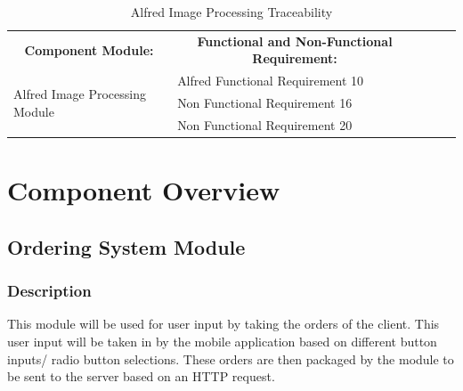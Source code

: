 \documentclass [10pt]{article}
\begin{document}
\begin{table}[h!]
\centering
\begin{tabular}{lllll}
\cline{1-2}
\multicolumn{1}{|c|}{\textbf{Component Module:}} & \multicolumn{1}{c|}{\textbf{Functional and Non-Functional Requirement:}} &  &  &  \\ \cline{1-2}
\multicolumn{1}{|l|}{\multirow{3}{*}{Alfred Image Processing Module}} & \multicolumn{1}{l|}{Alfred Functional Requirement 10} &  &  &  \\ \cline{2-2}
\multicolumn{1}{|l|}{} & \multicolumn{1}{l|}{Non Functional Requirement 16} &  &  &  \\ \cline{2-2}
\multicolumn{1}{|l|}{} & \multicolumn{1}{l|}{Non Functional Requirement 20} &  &  &  \\ \cline{1-2}
\end{tabular}
\caption{Alfred Image Processing Traceability}
\end{table}



\pagebreak


\section{Component Overview}

\subsection{Ordering System Module}


\subsubsection{Description}
This module will be used for user input by taking the orders of the client. This user input will be taken in by the mobile application based on different button inputs/ radio button selections. These orders are then packaged by the module to be sent to the server based on an HTTP request.

\end{document}
